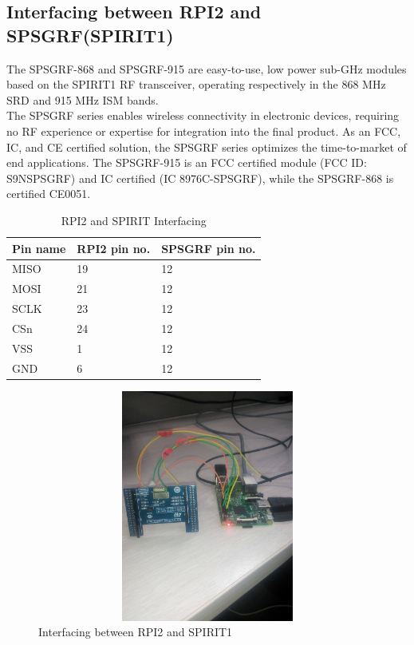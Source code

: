 \subsection{Interfacing between RPI2 and SPSGRF(SPIRIT1)}
The SPSGRF-868 and SPSGRF-915 are easy-to-use, low power sub-GHz modules based on the SPIRIT1 RF transceiver, operating respectively in the 868 MHz SRD and 915 MHz ISM bands.\\
The SPSGRF series enables wireless connectivity in electronic devices, requiring no RF experience or expertise for integration into the final product. As an FCC, IC, and CE certified solution, the SPSGRF series optimizes the time-to-market of end applications. The SPSGRF-915 is an FCC certified module (FCC ID: S9NSPSGRF) and IC certified (IC 8976C-SPSGRF), while the SPSGRF-868 is certified CE0051.
\begin{table}[ht]
	\centering
	\scalebox{1}
	{
		\begin{tabular}{|K{3cm} | K{2cm} | K{5cm}|}
		\toprule
		\textbf{Pin name} & \textbf{RPI2 pin no.} & \textbf{SPSGRF pin no.} \\
		\hline
		MISO & 19 & 12 \\
		\hline
		MOSI & 21 & 12 \\
		\hline
		SCLK & 23 & 12 \\
		\hline
		CSn & 24 & 12 \\
		\hline
		VSS & 1 & 12 \\
		\hline
		GND & 6 & 12 \\
		\bottomrule
		\end{tabular}
	}
	\caption{RPI2 and SPIRIT Interfacing}
\end{table}
\begin{figure}[H]
	\centering
	\includegraphics[width=4.5in, height=3in]{images/interfacing.jpg}
	\caption{Interfacing between RPI2 and SPIRIT1}
\end{figure}
